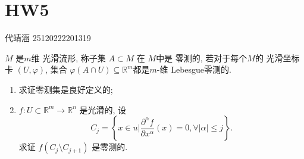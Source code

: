\documentclass[../main.tex]{subfiles}
\begin{document}
\ifSubfilesClassLoaded{

    
}{}

\chapter{ HW5 }
 代靖涵 25120222201319

\begin{exercise}{}{}
$M$ 是\(  m  \)维 光滑流形, 称子集 $A \subset M$ 在 \(  M  \)中是 零测的, 若对于每个\(  M  \)的 光滑坐标卡 \(  \left( U,   \varphi \right)   \), 集合 \(   \varphi \left( A\cap U \right)\subseteq \mathbb{R} ^{m}   \)都是\(  m  \)-维 Lebesgue零测的.  
\begin{enumerate}
    \item[a).] 求证零测集是良好定义的; 
    \item[b).] $f: U \subset \mathbb{R}^m \to \mathbb{R}^n$ 是光滑的, 设
    \[
    C_j = \left\{ x \in u \bigg| \frac{\partial^\alpha f}{\partial x^\alpha}(x) = 0, \forall |\alpha| \le j \right\}.
    \]
    求证 $f(C_j \setminus C_{j+1})$ 是零测的.
\end{enumerate}
\end{exercise}
\end{document}
